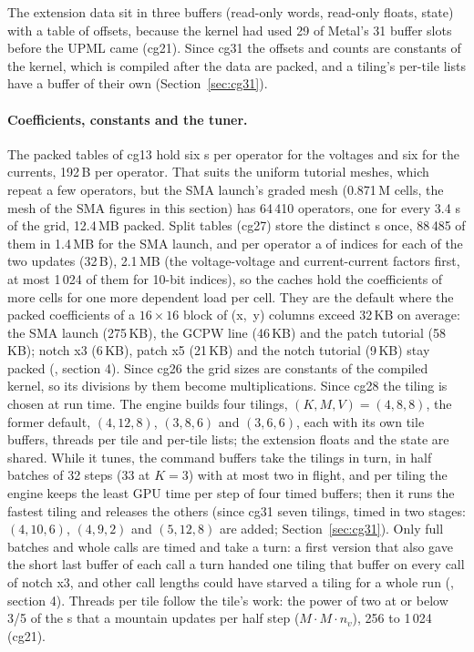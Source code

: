 The extension data sit in three buffers (read-only words, read-only floats, state) with a table of offsets, because
the kernel had used 29 of Metal's 31 buffer slots before the UPML came (cg21). Since cg31 the offsets and counts
are constants of the kernel, which is compiled after the data are packed, and a tiling's per-tile lists have a buffer
of their own (Section~\ref{sec:cg31}).

\paragraph{Coefficients, constants and the tuner.} The packed tables of cg13 hold six s per operator
for the voltages and six for the currents, 192\,B per operator. That suits the uniform tutorial meshes, which repeat a
few operators, but the SMA launch's graded mesh (0.871\,M cells, the mesh of the SMA figures in this section) has
64\,410 operators, one for every 3.4 s of the grid,
12.4\,MB packed. Split tables (cg27) store
the distinct s once, 88\,485 of them in 1.4\,MB for the SMA launch, and per operator a  of
indices for each of the two updates (32\,B), 2.1\,MB (the voltage-voltage and current-current factors first, at most
1\,024 of them for 10-bit indices),
so the caches hold the coefficients of more cells for one more dependent load per cell. They are the default where
the packed coefficients of a $16\times16$ block of (x,~y) columns exceed 32\,KB on average: the SMA launch (275\,KB),
the GCPW line (46\,KB) and the patch tutorial (58\,KB); notch x3 (6\,KB), patch x5 (21\,KB) and the notch tutorial
(9\,KB) stay packed (, section 4). Since cg26 the grid sizes
are constants of the compiled kernel, so its divisions by them become multiplications. Since cg28 the tiling is
chosen at run time. The engine builds four tilings, $(K,M,V) = (4,8,8)$, the former default, $(4,12,8)$, $(3,8,6)$ and
$(3,6,6)$, each with its own tile buffers, threads per tile and per-tile lists; the extension floats and the state
are shared. While it tunes, the command buffers take the tilings in turn, in half batches of 32 steps (33 at $K=3$)
with at most two in flight, and per tiling the engine keeps the least GPU time per step of four timed buffers; then it runs the
fastest tiling and releases the others (since cg31 seven tilings, timed in two stages: $(4,10,6)$, $(4,9,2)$ and
$(5,12,8)$ are added; Section~\ref{sec:cg31}).
Only full batches and whole calls are timed and take a turn: a first version
that also gave the short last buffer of each call a turn handed one tiling that buffer on every call of notch x3, and
other call lengths could have starved a tiling for a whole run
(, section 4). Threads per tile follow the tile's work: the
power of two at or below 3/5 of the s that a mountain updates per half step ($M\cdot M\cdot n_v$), 256
to 1\,024 (cg21).

